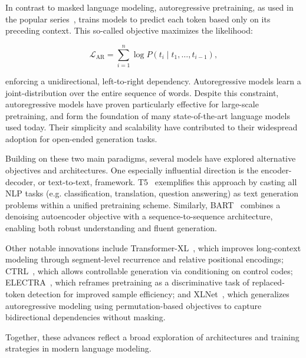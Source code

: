 In contrast to masked language modeling, autoregressive pretraining, as used in the popular  series~\citep{radford2018gpt1, radford2019gpt2, brown2020gpt3}, trains models to predict each token based only on its preceding context. This so-called  objective maximizes the likelihood:

\begin{equation}
\mathcal{L}_{\text{AR}} = \sum_{i=1}^n \log P(t_i \mid t_1, \ldots, t_{i-1}),
\label{eq:ar-loss}
\end{equation}

enforcing a unidirectional, left-to-right dependency. Autoregressive models learn a joint-distribution over the entire sequence of words. Despite this constraint, autoregressive models have proven particularly effective for large-scale pretraining, and form the foundation of many state-of-the-art language models used today. Their simplicity and scalability have contributed to their widespread adoption for open-ended generation tasks.

Building on these two main paradigms, several models have explored alternative objectives and architectures. One especially influential direction is the encoder-decoder, or text-to-text, framework. T5~\citep{raffel2020t5} exemplifies this approach by casting all NLP tasks (e.g. classification, translation, question answering) as text generation problems within a unified pretraining scheme. Similarly, BART~\citep{lewis2020bart} combines a denoising autoencoder objective with a sequence-to-sequence architecture, enabling both robust understanding and fluent generation.

Other notable innovations include Transformer-XL~\citep{dai2019transformer}, which improves long-context modeling through segment-level recurrence and relative positional encodings; CTRL~\citep{keskar2019ctrl}, which allows controllable generation via conditioning on control codes; ELECTRA~\citep{clark2020electra}, which reframes pretraining as a discriminative task of replaced-token detection for improved sample efficiency; and XLNet~\citep{yang2019xlnet}, which generalizes autoregressive modeling using permutation-based objectives to capture bidirectional dependencies without masking.

Together, these advances reflect a broad exploration of architectures and training strategies in modern language modeling.

